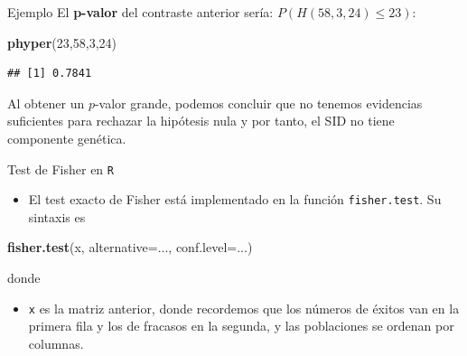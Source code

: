 \documentclass[
  ignorenonframetext,
]{beamer}
\newenvironment{Shaded}{\begin{snugshade}}{\end{snugshade}}
\newcommand{\DataTypeTok}[1]{\textcolor[rgb]{0.13,0.29,0.53}{#1}}
\newcommand{\DecValTok}[1]{\textcolor[rgb]{0.00,0.00,0.81}{#1}}
\newcommand{\KeywordTok}[1]{\textcolor[rgb]{0.13,0.29,0.53}{\textbf{#1}}}
\newcommand{\NormalTok}[1]{#1}
\providecommand{\tightlist}{%
  \setlength{\itemsep}{0pt}\setlength{\parskip}{0pt}}
\begin{document}
\begin{frame}[fragile]{Ejemplo}
\protect\hypertarget{ejemplo-38}{}
El \textbf{p-valor} del contraste anterior sería:
\(P(H(58,3,24)\leq 23)\):

\begin{Shaded}
\begin{Highlighting}[]
\KeywordTok{phyper}\NormalTok{(}\DecValTok{23}\NormalTok{,}\DecValTok{58}\NormalTok{,}\DecValTok{3}\NormalTok{,}\DecValTok{24}\NormalTok{)}
\end{Highlighting}
\end{Shaded}

\begin{verbatim}
## [1] 0.7841
\end{verbatim}

Al obtener un \(p\)-valor grande, podemos concluir que no tenemos
evidencias suficientes para rechazar la hipótesis nula y por tanto, el
SID no tiene componente genética.
\end{frame}

\begin{frame}[fragile]{Test de Fisher en \texttt{R}}
\protect\hypertarget{test-de-fisher-en-r}{}
\begin{itemize}[<+->]
\tightlist
\item
  El test exacto de Fisher está implementado en la función
  \texttt{fisher.test}. Su sintaxis es
\end{itemize}

\begin{Shaded}
\begin{Highlighting}[]
\KeywordTok{fisher.test}\NormalTok{(x, }\DataTypeTok{alternative=}\NormalTok{..., }\DataTypeTok{conf.level=}\NormalTok{...)}
\end{Highlighting}
\end{Shaded}

donde

\begin{itemize}[<+->]
\tightlist
\item
  \texttt{x} es la matriz anterior, donde recordemos que los números de
  éxitos van en la primera fila y los de fracasos en la segunda, y las
  poblaciones se ordenan por columnas.
\end{itemize}
\end{frame}
\end{document}
